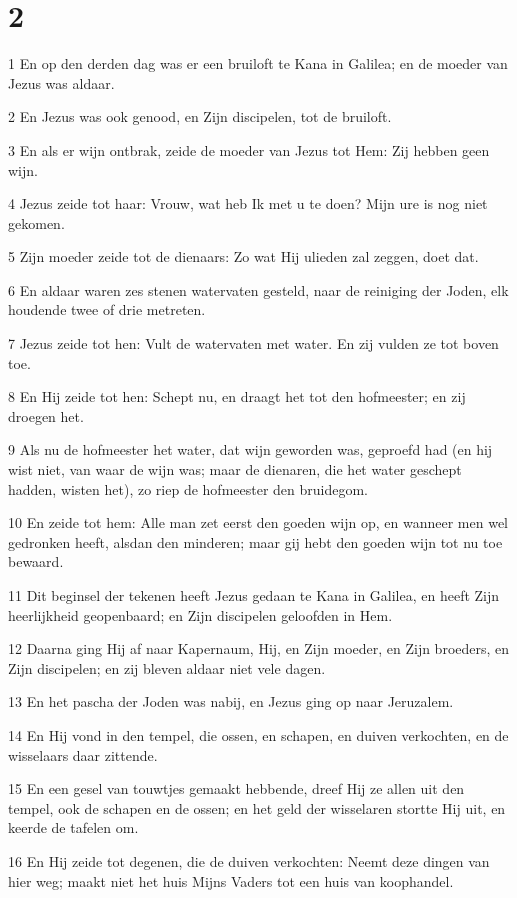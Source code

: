\chapter{2}

\par 1 En op den derden dag was er een bruiloft te Kana in Galilea; en de moeder van Jezus was aldaar.
\par 2 En Jezus was ook genood, en Zijn discipelen, tot de bruiloft.
\par 3 En als er wijn ontbrak, zeide de moeder van Jezus tot Hem: Zij hebben geen wijn.
\par 4 Jezus zeide tot haar: Vrouw, wat heb Ik met u te doen? Mijn ure is nog niet gekomen.
\par 5 Zijn moeder zeide tot de dienaars: Zo wat Hij ulieden zal zeggen, doet dat.
\par 6 En aldaar waren zes stenen watervaten gesteld, naar de reiniging der Joden, elk houdende twee of drie metreten.
\par 7 Jezus zeide tot hen: Vult de watervaten met water. En zij vulden ze tot boven toe.
\par 8 En Hij zeide tot hen: Schept nu, en draagt het tot den hofmeester; en zij droegen het.
\par 9 Als nu de hofmeester het water, dat wijn geworden was, geproefd had (en hij wist niet, van waar de wijn was; maar de dienaren, die het water geschept hadden, wisten het), zo riep de hofmeester den bruidegom.
\par 10 En zeide tot hem: Alle man zet eerst den goeden wijn op, en wanneer men wel gedronken heeft, alsdan den minderen; maar gij hebt den goeden wijn tot nu toe bewaard.
\par 11 Dit beginsel der tekenen heeft Jezus gedaan te Kana in Galilea, en heeft Zijn heerlijkheid geopenbaard; en Zijn discipelen geloofden in Hem.
\par 12 Daarna ging Hij af naar Kapernaum, Hij, en Zijn moeder, en Zijn broeders, en Zijn discipelen; en zij bleven aldaar niet vele dagen.
\par 13 En het pascha der Joden was nabij, en Jezus ging op naar Jeruzalem.
\par 14 En Hij vond in den tempel, die ossen, en schapen, en duiven verkochten, en de wisselaars daar zittende.
\par 15 En een gesel van touwtjes gemaakt hebbende, dreef Hij ze allen uit den tempel, ook de schapen en de ossen; en het geld der wisselaren stortte Hij uit, en keerde de tafelen om.
\par 16 En Hij zeide tot degenen, die de duiven verkochten: Neemt deze dingen van hier weg; maakt niet het huis Mijns Vaders tot een huis van koophandel.
